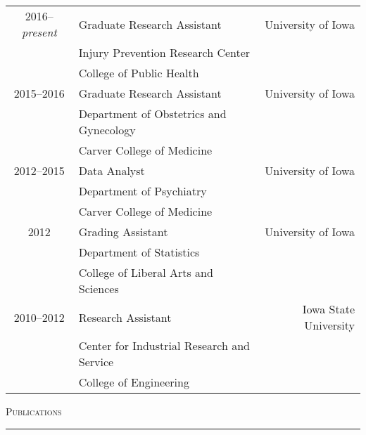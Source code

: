 \documentclass[a4paper]{article}
\begin{document}
\begin{tabular*}{0.95\textwidth}{@{\extracolsep{\fill}}clr}
  2016--\textit{present} & Graduate Research Assistant & University of Iowa \\
   & Injury Prevention Research Center & \\
   & College of Public Health & \\[3pt]
  2015--2016 & Graduate Research Assistant & University of Iowa \\
   & Department of Obstetrics and Gynecology & \\
   & Carver College of Medicine & \\
  2012--2015 & Data Analyst & University of Iowa \\
   & Department of Psychiatry & \\
   & Carver College of Medicine & \\[3pt]
  2012 & Grading Assistant & University of Iowa \\
   & Department of Statistics & \\
   & College of Liberal Arts and Sciences & \\[3pt]
  2010--2012 & Research Assistant & Iowa State University \\
   & Center for Industrial Research and Service \\
   & College of Engineering &
\end{tabular*}
\vspace{0.25\baselineskip}


\begin{flushleft}
  \Large\textsc{Publications}
  \textcolor{usafagrey}{\rule[0.5\baselineskip]{\textwidth}{0.75pt}}
\end{flushleft}
\vspace{-1.5\baselineskip}
\end{document}
